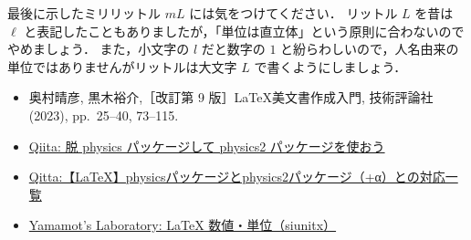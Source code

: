 最後に示したミリリットル $\si{mL}$ には気をつけてください．
リットル $\si{L}$ を昔は $\ell$ と表記したこともありましたが，「単位は直立体」という原則に合わないのでやめましょう．
また，小文字の $\si{l}$ だと数字の $1$ と紛らわしいので，人名由来の単位ではありませんがリットルは大文字 $\si{L}$ で書くようにしましょう．

\begin{tcolorbox}[title={第~\ref{ch:basic}~章の参考文献}, colback=yellow!5!white, colframe=yellow!75!black, coltitle=black]
    \begin{itemize}
        \item 奥村晴彦, 黒木裕介,［改訂第 9 版］\LaTeX 美文書作成入門, 技術評論社 (2023), pp.~25--40, 73--115.
        \item \href{https://qiita.com/Yarakashi_Kikohshi/items/131e2324f401c3effb84}{Qiita: 脱 physics パッケージして physics2 パッケージを使おう}
        \item \href{https://qiita.com/gawara-t/items/57834e06f7fd95c18d26}{Qitta:【LaTeX】physicsパッケージとphysics2パッケージ（+α）との対応一覧}
        \item \href{http://www.yamamo10.jp/yamamoto/comp/latex/make_doc/unit/index.php}{Yamamot's Laboratory: LaTeX 数値・単位（siunitx）}
    \end{itemize}
\end{tcolorbox}


